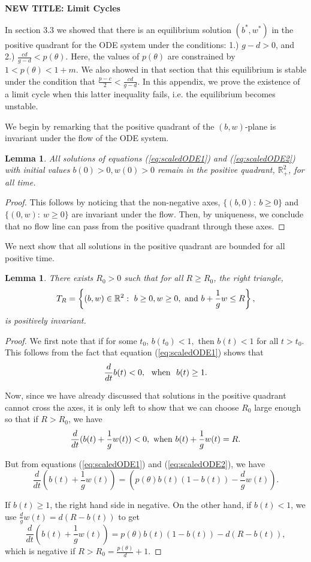 \documentclass[review,authoryear]{elsarticle}
\newtheorem{lemma}[theorem]{Lemma}
\begin{document}
\textbf{NEW TITLE:  Limit Cycles}

In section 3.3 we showed that there is an equilibrium solution $(b^*,w^*)$ in the positive quadrant for the ODE system under the conditions:  1.)  $g-d>0$, and 2.) $\frac{cd}{g-d}<p(\theta)$.   Here, the values of  $p(\theta)$ are constrained by $1<p(\theta)<1+m$.   We also showed in that section that this 
equilibrium is stable under the condition that $\frac{p-c}{2} < \frac{cd}{g-d}.$   In this appendix, we prove the existence of a limit cycle when this latter inequality fails, i.e. the equilibrium becomes unstable.

We begin by remarking that the positive quadrant of the $(b,w)$-plane is invariant under the flow of the ODE system.

\begin{lemma}


All solutions of equations (\ref{eq:scaledODE1}) and
  (\ref{eq:scaledODE2}) with initial values
  $b\left( 0\right) > 0 ,w\left( 0\right) >0$ remain in the positive quadrant, $\mathbb R_+^2$, for all time.
\end{lemma}

\begin{proof}
  This follows by noticing that the non-negative axes, $\{(b,0):\  b \ge 0\}$ and $\{(0,w):\  w\ge 0\}$ are invariant under the flow.  Then, by uniqueness, we conclude that no flow line can pass from the positive quadrant through these axes.
\end{proof}

We next show that all solutions in the positive quadrant are bounded for all positive time.  

\begin{lemma}
There exists $R_{0}>0$  such that for all $R\geq R_{0}$, the right
triangle, 
$$T_{R}=\left\{ \left(b,w\right) \in \mathbb R^{2}:\  b\ge 0, w\ge 0, \ {\rm and}\  b+\frac{1}{g}w\le R\right\}, $$  
is positively invariant.
\end{lemma}

\begin{proof}
  We first note that if for some $t_0$, $b(t_0)< 1,$ then $b(t) < 1$ for all $t>t_0$.  This follows from the fact that equation (\ref{eq:scaledODE1}) shows that 
  $$\frac{d}{dt}b(t) < 0,\  \  {\rm when}\ \ b(t)\ge 1.$$
  
  Now, since we have already discussed that solutions in the positive quadrant cannot cross the axes, it is only left to show that we can choose $R_0$ large enough so that if $R>R_0$, we have
  $$\frac{d}{dt}(b(t)+\frac{1}{g}w(t)) <0,\  {\rm when}\  b(t)+\frac{1}{g}w(t) =R.$$
  
  But from equations (\ref{eq:scaledODE1}) and (\ref{eq:scaledODE2}), we have
  $$\frac{d}{dt}(b(t)+\frac{1}{g}w(t))  =\left( p\left( \theta \right) b(t)\left( 1-b(t)\right) -\frac{d}{g}
w\left( t\right) \right). $$

If $b(t) \ge 1$, the right hand side in negative.  On the other hand, if $b(t) < 1$, we use $\frac{d}{g}w(t) = d(R-b(t))$ to get
$$\frac{d}{dt}(b(t)+\frac{1}{g}w(t)) =p\left( \theta \right) b(t)\left(
1-b(t)\right) -d\left( R-b(t)\right),$$
which is negative if $R>R_0= \frac{p(\theta)}{d} +1.$
\end{proof}
\end{document}
